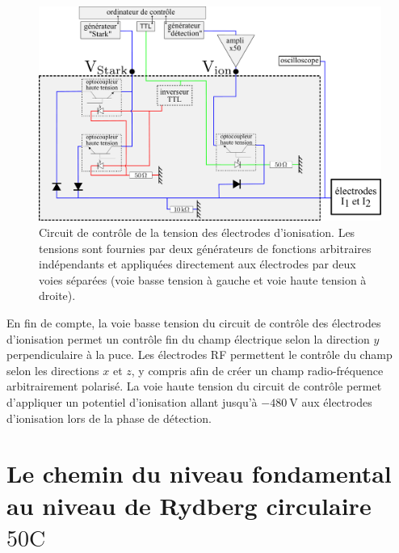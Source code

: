 %
\begin{figure}
\centering
\includegraphics[width=\linewidth]{figures/circulars/detectionbox_CdF}
\caption[Second circuit de contrôle de la tension des électrodes d'ionisation]{
Circuit de contrôle de la tension des électrodes d'ionisation.
Les tensions sont fournies par deux générateurs de fonctions arbitraires indépendants et appliquées directement aux électrodes par deux voies séparées (voie basse tension à gauche et voie haute tension à droite).
}
\label{fig:detectionbox_CdF}
\end{figure}

En fin de compte, la voie basse tension du circuit de contrôle des électrodes d'ionisation permet un contrôle fin du champ électrique selon la direction $y$ perpendiculaire à la puce.
Les électrodes RF permettent le contrôle du champ selon les directions $x$ et $z$, y compris afin de créer un champ radio-fréquence arbitrairement polarisé.
La voie haute tension du circuit de contrôle permet d'appliquer un potentiel d'ionisation allant jusqu'à $\SI{-480}{\V}$ aux électrodes d'ionisation lors de la phase de détection.


\clearpage
\section{Le chemin du niveau fondamental au niveau de Rydberg circulaire $\mathrm{50C}$}\label{sec:groundtocirc}
%

